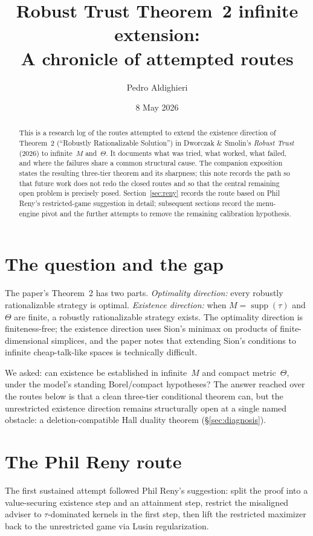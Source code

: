\documentclass[11pt]{article}
\title{
  Robust Trust Theorem~2 infinite extension:\\
  \large A chronicle of attempted routes
}
\author{Pedro Aldighieri}
\date{8 May 2026}
\theoremstyle{definition}
\theoremstyle{remark}
\newcommand{\Th}{\Theta}
\newcommand{\suppset}{\operatorname{supp}}
\begin{document}
\maketitle

\begin{abstract}
This is a research log of the routes attempted to extend the
existence direction of Theorem~2 (``Robustly Rationalizable
Solution'') in Dworczak \& Smolin's \emph{Robust Trust} (2026) to
infinite~$M$ and~$\Th$. It documents what was tried, what worked,
what failed, and where the failures share a common structural cause.
The companion exposition states the resulting three-tier theorem and
its sharpness; this note records the path so that future work does
not redo the closed routes and so that the central remaining open
problem is precisely posed. Section~\ref{sec:reny} records the route
based on Phil Reny's restricted-game suggestion in detail;
subsequent sections record the menu-engine pivot and the further
attempts to remove the remaining calibration hypothesis.
\end{abstract}

\section{The question and the gap}\label{sec:gap}

The paper's Theorem~2 has two parts. \emph{Optimality direction:} every
robustly rationalizable strategy is optimal. \emph{Existence direction:}
when $M = \suppset(\tau)$ and $\Th$ are finite, a robustly
rationalizable strategy exists. The optimality direction is
finiteness-free; the existence direction uses Sion's minimax on
products of finite-dimensional simplices, and the paper notes that
extending Sion's conditions to infinite cheap-talk-like spaces is
technically difficult.

We asked: can existence be established in infinite~$M$ and compact
metric~$\Th$, under the model's standing Borel/compact hypotheses?
The answer reached over the routes below is that a clean three-tier
conditional theorem can, but the unrestricted existence direction
remains structurally open at a single named obstacle: a
deletion-compatible Hall duality theorem
(\S\ref{sec:diagnosis}).

\section{The Phil Reny route}\label{sec:reny}

The first sustained attempt followed Phil Reny's suggestion: split
the proof into a value-securing existence step and an attainment
step, restrict the misaligned adviser to $\tau$-dominated kernels in
the first step, then lift the restricted maximizer back to the
unrestricted game via Lusin regularization.
\end{document}
